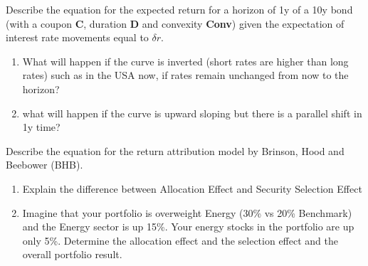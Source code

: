 \documentclass[12pt,a4paper]{exam}
\begin{document}
\begin{questions}
\question Describe the equation for the expected return for a horizon of 1y of a 10y bond (with a coupon \textbf{C}, duration \textbf{D} and convexity \textbf{Conv}) given the expectation of interest rate movements equal to $\delta r$.
\begin{enumerate}[label=(\alph*),font=\itshape]
\item What will happen if the curve is inverted (short rates are higher than long rates) such as in the USA now, if rates remain unchanged from now to the horizon? 
\item what will happen if the curve is upward sloping but there is a parallel shift in 1y time?
\end{enumerate}
\fillwithlines{3cm}
\begin{solution}
\end{solution}

\question Describe the equation for the return attribution model by Brinson, Hood and Beebower (BHB). 
\begin{enumerate}[label=(\alph*),font=\itshape]
\item Explain the difference between Allocation Effect and Security Selection Effect 
\item Imagine that your portfolio is overweight Energy (30\% vs 20\% Benchmark) and the Energy sector is up 15\%. Your energy stocks in the portfolio are up only 5\%. Determine the allocation effect and the selection effect and the overall portfolio result.
\end{enumerate}
\fillwithlines{3cm}
\begin{solution}
\end{solution}

%
%


\end{questions}
\end{document}
